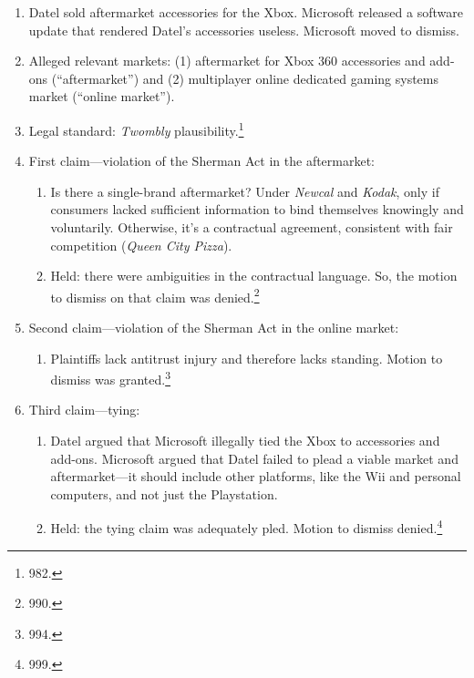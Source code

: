 \begin{enumerate}
    \item Datel sold aftermarket accessories for the Xbox. Microsoft released 
    a software update that rendered Datel's accessories useless. Microsoft 
    moved to dismiss.
    \item Alleged relevant markets: (1) aftermarket for Xbox 360 accessories 
    and add-ons (``aftermarket'') and (2) multiplayer online dedicated gaming 
    systems market (``online market'').
    \item Legal standard: \emph{Twombly} plausibility.\footnote{982.}
    \item First claim---violation of the Sherman Act in the aftermarket:
    \begin{enumerate}
        \item Is there a single-brand aftermarket? Under \emph{Newcal} and 
        \emph{Kodak}, only if consumers lacked sufficient information to bind 
        themselves knowingly and voluntarily. Otherwise, it's a contractual 
        agreement, consistent with fair competition (\emph{Queen City Pizza}). 
        \item Held: there were ambiguities in the contractual language. So, 
        the motion to dismiss on that claim was denied.\footnote{990.}
    \end{enumerate}
    \item Second claim---violation of the Sherman Act in the online market:
    \begin{enumerate}
        \item Plaintiffs lack antitrust injury and therefore lacks standing. 
        Motion to dismiss was granted.\footnote{994.}
    \end{enumerate}
    \item Third claim---tying:
    \begin{enumerate}
        \item Datel argued that Microsoft illegally tied the Xbox to 
        accessories and add-ons. Microsoft argued that Datel failed to plead a 
        viable market and aftermarket---it should include other platforms, 
        like the Wii and personal computers, and not just the Playstation.
        \item Held: the tying claim was adequately pled. Motion to dismiss 
        denied.\footnote{999.}
    \end{enumerate}
\end{enumerate}
